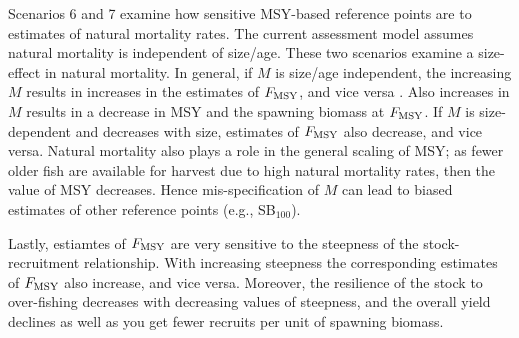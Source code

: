 Scenarios 6 and 7 examine how sensitive MSY-based reference points are to estimates of natural mortality rates.  The current assessment model assumes natural mortality is independent of size/age.  These two scenarios examine a size-effect in natural mortality.  In general, if $M$ is size/age independent, the increasing $M$ results in increases in the estimates of $F_{\rm{MSY}}$, and vice versa \citep{WalMart2004}.  Also increases in $M$ results in a decrease in MSY and the spawning biomass at $F_{\rm{MSY}}$.  If $M$ is size-dependent and decreases with size, estimates of $F_{\rm{MSY}}$  also decrease, and vice versa.  Natural mortality also plays a role in the general scaling of MSY; as fewer older fish are available for harvest due to high natural mortality rates, then the value of MSY decreases.  Hence mis-specification of $M$ can lead to biased estimates of other reference points (e.g., SB$_{100}$).

Lastly, estiamtes of $F_{\rm{MSY}}$ are very sensitive to the steepness of the stock-recruitment relationship.  With increasing steepness the corresponding estimates of $F_{\rm{MSY}}$ also increase, and vice versa.  Moreover, the resilience of the stock to over-fishing decreases with decreasing values of steepness, and the overall yield declines as well as you get fewer recruits per unit of spawning biomass.





